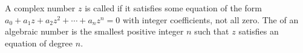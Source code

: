 A complex number $z$ is called  if it satisfies some equation of the form $a_0 + a_1 z + a_2 z^2 + \cdots + a_n z^n = 0$ with integer coefficients, not all zero. The  of an algebraic number is the smallest positive integer $n$ such that $z$ satisfies an equation of degree $n$.
